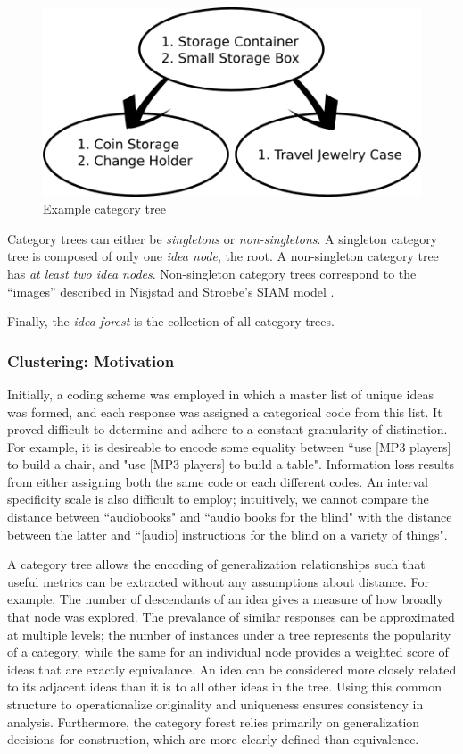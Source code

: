 \begin{figure}[!h]
    \centering
    \includegraphics[width=0.9\columnwidth]{example_instances}
    \caption{Example category tree}
    \label{fig:example_instances}
\end{figure}

Category trees can either be \emph{singletons} or \emph{non-singletons}. A singleton category tree is composed of only one \emph{idea node}, the root. A non-singleton category tree has \emph{at least two idea nodes}. Non-singleton category trees correspond to the ``images'' described in Nisjstad and Stroebe's SIAM model \cite{nijstad_how_2006}.

Finally, the \emph{idea forest} is the collection of all category trees.

\subsubsection{Clustering: Motivation}

Initially, a coding scheme was employed in which a master list of unique ideas was formed, and each response was assigned a categorical code from this list. It proved difficult to determine and adhere to a constant granularity of distinction. For example, it is desireable to encode some equality between ``use [MP3 players] to build a chair, and "use [MP3 players] to build a table". Information loss results from either assigning both the same code or each different codes. An interval specificity scale is also difficult to employ; intuitively, we cannot compare the distance between ``audiobooks" and ``audio books for the blind" with the distance between the latter and ``[audio] instructions for the blind on a variety of things".

A category tree allows the encoding of generalization relationships such that useful metrics can be extracted without any assumptions about distance.
For example, The number of descendants of an idea gives a measure of how broadly that node was explored. 
The prevalance of similar responses can be approximated at multiple levels; the number of instances under a tree represents the popularity of a category, while the same for an individual node provides a weighted score of ideas that are exactly equivalance.
An idea can be considered more closely related to its adjacent ideas than it is to all other ideas in the tree.
Using this common structure to operationalize originality and uniqueness ensures consistency in analysis. Furthermore, the category forest relies primarily on generalization decisions for construction, which are more clearly defined than equivalence.


